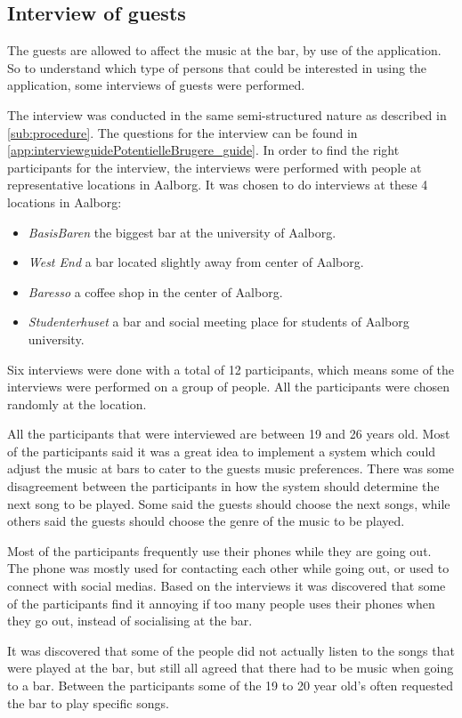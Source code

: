 \subsection{Interview of guests}
\label{userInterviews}

The guests are allowed to affect the music at the bar, by use of the application. So to understand which type of persons that could be interested in using the application, some interviews of guests were performed.

The interview was conducted in the same semi-structured nature as described in \cref{sub:procedure}. The questions for the interview can be found in \cref{app:interviewguidePotentielleBrugere_guide}. In order to find the right participants for the interview, the interviews were performed with people at representative locations in Aalborg. It was chosen to do interviews at these 4 locations in Aalborg:

\begin{itemize}
    \item \emph{BasisBaren} the biggest bar at the university of Aalborg.
    \item \emph{West End} a bar located slightly away from center of Aalborg.
    \item \emph{Baresso} a coffee shop in the center of Aalborg.
    \item \emph{Studenterhuset} a bar and social meeting place for students of Aalborg university.
\end{itemize}

Six interviews were done with a total of 12 participants, which means some of the interviews were performed on a group of people. All the participants were chosen randomly at the location.

All the participants that were interviewed are between 19 and 26 years old. Most of the participants said it was a great idea to implement a system which could adjust the music at bars to cater to the guests music preferences. There was some disagreement between the participants in how the system should determine the next song to be played. Some said the guests should choose the next songs, while others said the guests should choose the genre of the music to be played.

Most of the participants frequently use their phones while they are going out. The phone was mostly used for contacting each other while going out, or used to connect with social medias.
Based on the interviews it was discovered that some of the participants find it annoying if too many people uses their phones when they go out, instead of socialising at the bar.

It was discovered that some of the people did not actually listen to the songs that were played at the bar, but still all agreed that there had to be music when going to a bar. Between the participants some of the 19 to 20 year old's often requested the bar to play specific songs.
